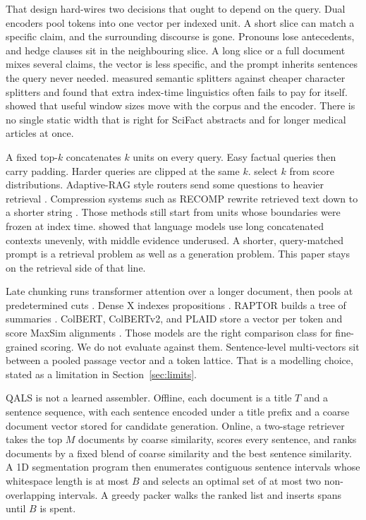 \documentclass[preprint,12pt,authoryear]{elsarticle}
\begin{document}
That design hard-wires two decisions that ought to depend on the query. Dual encoders pool tokens into one vector per indexed unit. A short slice can match a specific claim, and the surrounding discourse is gone. Pronouns lose antecedents, and hedge clauses sit in the neighbouring slice. A long slice or a full document mixes several claims, the vector is less specific, and the prompt inherits sentences the query never needed. \citet{qu2025semantic} measured semantic splitters against cheaper character splitters and found that extra index-time linguistics often fails to pay for itself. \citet{bhat2025rethinking} showed that useful window sizes move with the corpus and the encoder. There is no single static width that is right for SciFact abstracts and for longer medical articles at once.

A fixed top-\(k\) concatenates \(k\) units on every query. Easy factual queries then carry padding. Harder queries are clipped at the same \(k\). \citet{taguchi2025adaptivek} select \(k\) from score distributions. Adaptive-RAG style routers send some questions to heavier retrieval \citep{jeong2024adaptive}. Compression systems such as RECOMP rewrite retrieved text down to a shorter string \citep{xu2024recomp}. Those methods still start from units whose boundaries were frozen at index time. \citet{liu2024lost} showed that language models use long concatenated contexts unevenly, with middle evidence underused. A shorter, query-matched prompt is a retrieval problem as well as a generation problem. This paper stays on the retrieval side of that line.

Late chunking runs transformer attention over a longer document, then pools at predetermined cuts \citep{gunther2024late}. Dense X indexes propositions \citep{chen2024dense}. RAPTOR builds a tree of summaries \citep{sarthi2024raptor}. ColBERT, ColBERTv2, and PLAID store a vector per token and score MaxSim alignments \citep{khattab2020colbert,santhanam2022colbertv2,santhanam2022plaid}. Those models are the right comparison class for fine-grained scoring. We do not evaluate against them. Sentence-level multi-vectors sit between a pooled passage vector and a token lattice. That is a modelling choice, stated as a limitation in Section~\ref{sec:limits}.

QALS is not a learned assembler. Offline, each document is a title \(T\) and a sentence sequence, with each sentence encoded under a title prefix and a coarse document vector stored for candidate generation. Online, a two-stage retriever takes the top \(M\) documents by coarse similarity, scores every sentence, and ranks documents by a fixed blend of coarse similarity and the best sentence similarity. A 1D segmentation program then enumerates contiguous sentence intervals whose whitespace length is at most \(B\) and selects an optimal set of at most two non-overlapping intervals. A greedy packer walks the ranked list and inserts spans until \(B\) is spent.
\end{document}
